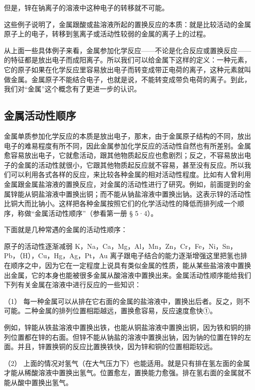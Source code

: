 但是，锌在钠离子的溶液中这种电子的转移就不可能。

这些例子说明了，金属跟酸或盐溶液所起的置换反应的本质：就是比较活动的金属原子上的电子，转移到氢离子或活动性较弱的金属的离子上的过程。

从上面一些具体例子来看，金属参加化学反应------不论是化合反应或置换反应------的特征都是放出电子而成阳离子。所以我们可以给金属下这样的定义：一种元素，它的原子如果在化学反应里容易放出电子而转变成带正电荷的离子，这种元素就叫做金属。金属原子不能结合电子，也就是说，不能转变成带负电荷的离子。到此，我们对``金属''这个概念有了更进一步的认识。

\subsection{金属活动性顺序}

金属单质参加化学反应的本质是放出电子，那末，由于金属原子结构的不同，放出电子的难易程度有所不同，因此金属参加化学反应的活动性自然也有所差别。金属愈容易放出电子，它就愈活动，跟其他物质起反应也愈剧烈；反之，不容易放出电子的金属的活动性就很小，它跟其他物质起反应就不容易，甚至没有反应。所以我们可以利用各式各样的反应，来比较各种金属的相对活动性程度。比如有人曾利用金属跟金属盐溶液的置换反应，对金属的活动性进行了研究。例如，前面提到的金属锌能从铜盐溶液中置换出铜；而不能从钠盐溶液中置换出钠。这表示锌的活动性比铜大而比钠小。这样把各种金属按照它们的化学活动性的降低而排列成一个顺序，称做``金属活动性顺序''（参看第一册
§ 5·4）。

下面就是几种常遇的金属的活动性顺序：

原子的活动性逐渐减弱
K，Na，Ca，Mg，Al，Mn，Zn，Cr，Fe，Ni，Sn，Pb，（H），Cu，Hg，Ag，Pt，Au
离子跟电子结合的能力逐渐增强这里把氢也排在顺序之中，因为它在一定程度上说具有类似金属的性质，能从某些盐溶液中置换出金属，它的本身也能被很多金属从酸溶液中置换出来。金属活动性顺序能给我们下列有关金属在溶液中进行反应的一些知识：

（1）
每一种金属可以从排在它右面的金属的盐溶液中，置换出后者。反之，则不可能。二种金属的排列位置相距越远，置换愈容易，反应速度愈快①。

例如，锌能从铁盐溶液中置换出铁，也能从铜盐溶液中置换出铜，因为铁和铜的排列位置都在锌的右面。但锌不能从钠盐的溶液中置换出钠，因为钠的位置在锌的左面。并且，锌置换铜的反应比置换铁快，因为锌和铜的位置相距较远。

（2）
上面的情况对氢气（在大气压力下）也能适用。就是只有排在氢左面的金属才能从稀酸溶液中置换出氢气。位置愈左，置换能力愈强。排在氢右面的金属就不能从酸中置换出氢气。

